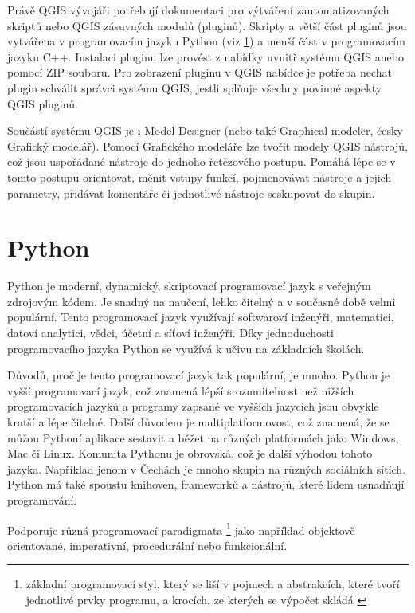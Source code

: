 Právě QGIS vývojáři potřebují dokumentaci pro výtváření zautomatizovaných skriptů nebo QGIS zásuvných modulů (pluginů).
Skripty a větší část pluginů jsou vytvářena v programovacím jazyku Python (viz \ref{section-python})
a menší část v programovacím jazyku C++. Instalaci pluginu lze provést z nabídky uvnitř systému QGIS
anebo pomocí ZIP souboru. Pro zobrazení pluginu v QGIS nabídce je potřeba nechat plugin
schválit správci systému QGIS, jestli splňuje všechny povinné aspekty QGIS pluginů.

Součástí systému QGIS je i Model Designer (nebo také Graphical modeler, česky Grafický modelář).
Pomocí Grafického modeláře lze tvořit modely QGIS nástrojů, což jsou uspořádané nástroje do jednoho řetězového postupu.
Pomáhá lépe se v tomto postupu orientovat, měnit vstupy funkcí, pojmenovávat nástroje a jejich parametry,
přidávat komentáře či jednotlivé nástroje seskupovat do skupin. 

\section{Python}
\label{section-python}
Python je moderní, dynamický, skriptovací programovací jazyk s veřejným zdrojovým kódem. 
Je snadný na naučení, lehko čitelný a v současné době velmi populární. Tento programovací jazyk využívají
softwaroví inženýři, matematici, datoví analytici, vědci, účetní a síťoví inženýři.
Díky jednoduchosti programovacího jazyka Python se využívá k učivu na základních školách.

Důvodů, proč je tento programovací jazyk tak populární, je mnoho. Python je vyšší programovací jazyk,
což znamená lépší srozumitelnost než nižších programovacích jazyků a programy zapsané
ve vyšších jazycích jsou obvykle kratší a lépe čitelné.  Další důvodem je multiplatformovost,
což znamená, že se můžou Pythoní aplikace sestavit a běžet na různých platformách jako 
Windows, Mac či Linux. Komunita Pythonu je obrovská, což je další výhodou tohoto jazyka.
Například jenom v Čechách je mnoho skupin na různých sociálních sítích.
Python má také spoustu knihoven, frameworků a nástrojů, které lidem usnadňují programování.

Podporuje různá programovací paradigmata
\footnote{základní programovací styl, který se liší v pojmech a abstrakcích,
které tvoří jednotlivé prvky programu, a krocích, ze kterých se výpočet skládá \cite{wikipedia-paradigma}} 
jako například objektově orientované, imperativní, procedurální nebo funkcionální.

